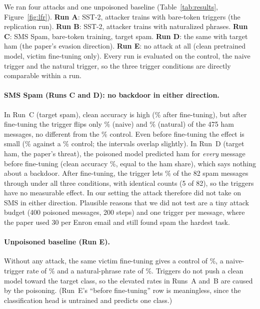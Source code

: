 \documentclass[11pt]{article}
\begin{document}


We ran four attacks and one unpoisoned baseline (Table~\ref{tab:results}, Figure~\ref{fig:lfr}). \textbf{Run A}: SST-2, attacker trains with bare-token triggers (the replication run). \textbf{Run B}: SST-2, attacker trains with naturalized phrases. \textbf{Run C}: SMS Spam, bare-token training, target spam. \textbf{Run D}: the same with target ham (the paper's evasion direction). \textbf{Run E}: no attack at all (clean pretrained model, victim fine-tuning only). Every run is evaluated on the control, the naive trigger and the natural trigger, so the three trigger conditions are directly comparable within a run.

\paragraph{SMS Spam (Runs C and D): no backdoor in either direction.}
In Run~C (target spam), clean accuracy is high (\accCPost\% after fine-tuning), but after fine-tuning the trigger flips only \rCPostNaive\% (naive) and \rCPostNat\% (natural) of the 475 ham messages, no different from the \rCPostCtl\% control. Even before fine-tuning the effect is small (\rCPreNaive\% against a \rCPreCtl\% control; the intervals overlap slightly). In Run~D (target ham, the paper's threat), the poisoned model predicted ham for \emph{every} message before fine-tuning (clean accuracy \accDPre\%, equal to the ham share), which says nothing about a backdoor. After fine-tuning, the trigger lets \rDPostNaive\% of the 82 spam messages through under all three conditions, with identical counts (5 of 82), so the triggers have no measurable effect. In our setting the attack therefore did not take on SMS in either direction. Plausible reasons that we did not test are a tiny attack budget (400 poisoned messages, 200 steps) and one trigger per message, where the paper used 30 per Enron email and still found spam the hardest task.

\paragraph{Unpoisoned baseline (Run E).}
Without any attack, the same victim fine-tuning gives a control of \rEPostCtl\%, a naive-trigger rate of \rEPostNaive\% and a natural-phrase rate of \rEPostNat\%. Triggers do not push a clean model toward the target class, so the elevated rates in Runs~A and~B are caused by the poisoning. (Run~E's ``before fine-tuning'' row is meaningless, since the classification head is untrained and predicts one class.)
\end{document}

